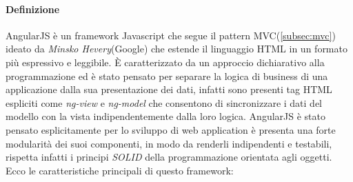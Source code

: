 \paragraph*{Definizione}
AngularJS è un framework Javascript che segue il pattern MVC(\ref{subsec:mvc}) ideato da \emph{Minsko Hevery}(Google) che estende il linguaggio HTML in un formato più espressivo e leggibile. È caratterizzato da un approccio dichiarativo alla programmazione ed è stato pensato per separare la logica di business di una applicazione dalla sua presentazione dei dati, infatti sono presenti tag HTML espliciti come \emph{ng-view} e \emph{ng-model} che consentono di sincronizzare i dati del modello con la vista indipendentemente dalla loro logica. AngularJS è stato pensato esplicitamente per lo sviluppo di web application è presenta una forte modularità dei suoi componenti, in modo da renderli indipendenti e testabili, rispetta infatti i principi \emph{SOLID} \citep{wiki:solid} della programmazione orientata agli oggetti.
Ecco le caratteristiche principali di questo framework:

